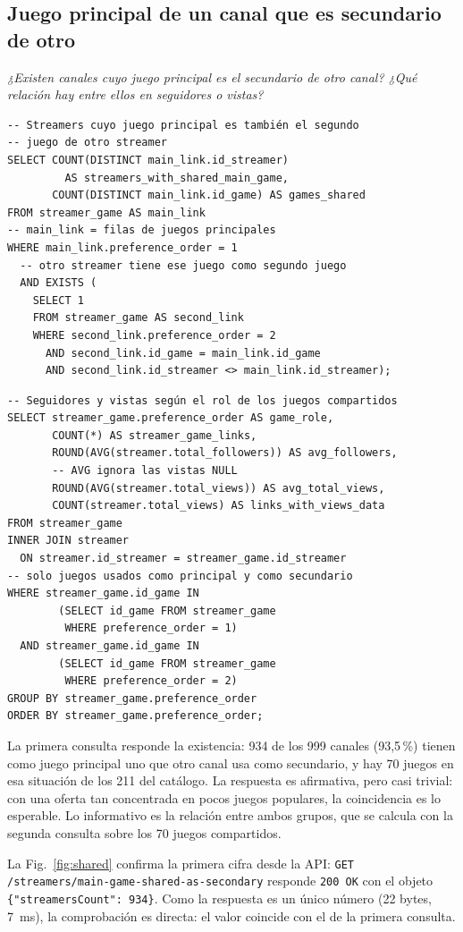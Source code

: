 \documentclass[conference]{IEEEtran}
\begin{document}
\subsection{Juego principal de un canal que es secundario de otro}
\emph{¿Existen canales cuyo juego principal es el secundario de otro canal? ¿Qué relación hay entre ellos en seguidores o vistas?}
\begin{lstlisting}
-- Streamers cuyo juego principal es también el segundo
-- juego de otro streamer
SELECT COUNT(DISTINCT main_link.id_streamer)
         AS streamers_with_shared_main_game,
       COUNT(DISTINCT main_link.id_game) AS games_shared
FROM streamer_game AS main_link
-- main_link = filas de juegos principales
WHERE main_link.preference_order = 1
  -- otro streamer tiene ese juego como segundo juego
  AND EXISTS (
    SELECT 1
    FROM streamer_game AS second_link
    WHERE second_link.preference_order = 2
      AND second_link.id_game = main_link.id_game
      AND second_link.id_streamer <> main_link.id_streamer);
\end{lstlisting}
\begin{lstlisting}
-- Seguidores y vistas según el rol de los juegos compartidos
SELECT streamer_game.preference_order AS game_role,
       COUNT(*) AS streamer_game_links,
       ROUND(AVG(streamer.total_followers)) AS avg_followers,
       -- AVG ignora las vistas NULL
       ROUND(AVG(streamer.total_views)) AS avg_total_views,
       COUNT(streamer.total_views) AS links_with_views_data
FROM streamer_game
INNER JOIN streamer
  ON streamer.id_streamer = streamer_game.id_streamer
-- solo juegos usados como principal y como secundario
WHERE streamer_game.id_game IN
        (SELECT id_game FROM streamer_game
         WHERE preference_order = 1)
  AND streamer_game.id_game IN
        (SELECT id_game FROM streamer_game
         WHERE preference_order = 2)
GROUP BY streamer_game.preference_order
ORDER BY streamer_game.preference_order;
\end{lstlisting}
La primera consulta responde la existencia: 934 de los 999 canales (93,5\,\%) tienen como juego principal uno que otro canal usa como secundario, y hay 70 juegos en esa situación de los 211 del catálogo. La respuesta es afirmativa, pero casi trivial: con una oferta tan concentrada en pocos juegos populares, la coincidencia es lo esperable. Lo informativo es la relación entre ambos grupos, que se calcula con la segunda consulta sobre los 70 juegos compartidos.

La Fig.~\ref{fig:shared} confirma la primera cifra desde la API: \texttt{GET /streamers/main-game-shared-as-secondary} responde \texttt{200 OK} con el objeto \texttt{\{"streamersCount": 934\}}. Como la respuesta es un único número (22 bytes, 7~ms), la comprobación es directa: el valor coincide con el de la primera consulta.
\end{document}
